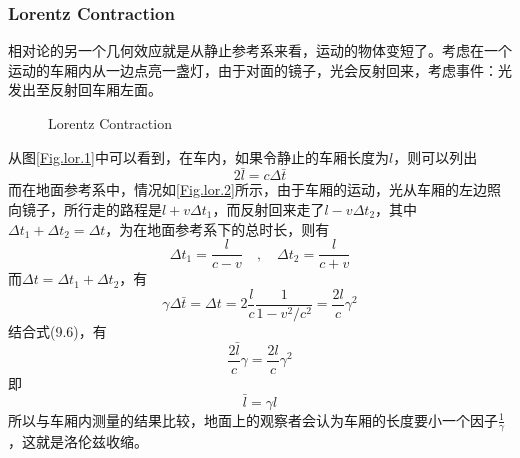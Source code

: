 \documentclass[14pt,oneside]{book}
\begin{document}
\begin{large}
\subsubsection{Lorentz Contraction}
相对论的另一个几何效应就是从静止参考系来看，运动的物体变短了。考虑在一个运动的车厢内从一边点亮一盏灯，由于对面的镜子，光会反射回来，考虑事件：光发出至反射回车厢左面。
\begin{figure}[H]
\centering  %
\caption{Lorentz Contraction}
\label{Fig.lor}
\end{figure}
从图\ref{Fig.lor.1}中可以看到，在车内，如果令静止的车厢长度为$l$，则可以列出
\begin{equation}
  2\bar l=c\Delta \bar t
\end{equation}
而在地面参考系中，情况如\ref{Fig.lor.2}所示，由于车厢的运动，光从车厢的左边照向镜子，所行走的路程是$l+v\Delta t_1$，而反射回来走了$l-v\Delta t_2$，其中$\Delta t_1+\Delta t_2=\Delta t$，为在地面参考系下的总时长，则有
\begin{equation}
  \Delta t_1=\frac{l}{c-v}\quad,\quad\Delta t_2=\frac{l}{c+v}
\end{equation}
而$\Delta t=\Delta t_1+\Delta t_2$，有
\begin{equation}
 \gamma\Delta\bar t= \Delta t=2\frac{l}{c}\frac{1}{1-v^2/c^2}=\frac{2l}{c}\gamma^2
\end{equation}
结合式(9.6)，有
\begin{equation}
  \frac{2\bar l}{c}\gamma=\frac{2l}{c}\gamma^2
\end{equation}
即
\begin{equation}
  \bar l=\gamma l
\end{equation}
所以与车厢内测量的结果比较，地面上的观察者会认为车厢的长度要小一个因子$\frac{1}{\gamma}$，这就是洛伦兹收缩。


\end{large}
\end{document}
